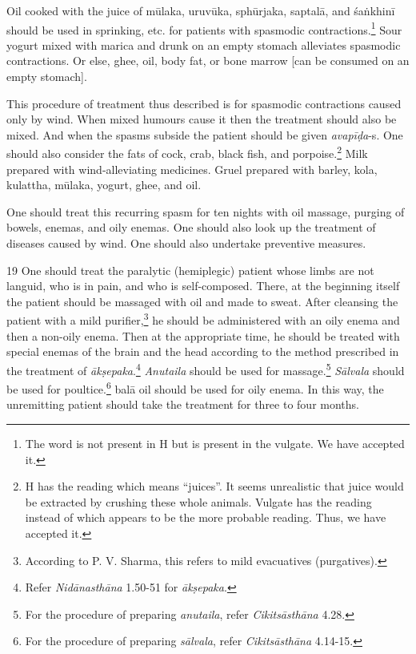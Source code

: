 \begin{translation}
    Oil cooked with the juice of \gls{mūlaka}, \gls{uruvūka}, \gls{sphūrjaka}, \gls{saptalā}, and \gls{śaṅkhinī} should be used in sprinking, etc. for patients with spasmodic contractions.\footnote{The word  is not present in H but is present in the vulgate. We have accepted it.} Sour yogurt mixed with \gls{marica} and drunk on an empty stomach alleviates spasmodic contractions. Or else, ghee, oil, body fat, or bone marrow [can be consumed on an empty stomach]. 
    
    This procedure of treatment thus described is for spasmodic contractions caused only by wind. When mixed humours cause it then the treatment should also be mixed. And when the spasms subside the patient should be given \textit{avapīḍa}-s. One should also consider the fats of cock, crab, black fish, and porpoise.\footnote{H has the reading  which means \enquote{juices}. It seems unrealistic that juice would be extracted by crushing these whole animals. Vulgate has the reading  instead of  which appears to be the more probable reading. Thus, we have accepted it.} Milk prepared with wind-alleviating medicines. Gruel prepared with barley, \gls{kola}, \gls{kulattha}, \gls{mūlaka}, yogurt, ghee, and oil. 

    One should treat this recurring spasm for ten nights with oil massage, purging of bowels, enemas, and oily enemas. One should also look up the treatment of diseases caused by wind. One should also undertake preventive measures.   

    \item[19]
    One should treat the paralytic (hemiplegic) patient whose limbs are not languid, who is in pain, and who is self-composed. There, at the beginning itself the patient should be massaged with oil and made to sweat. After cleansing the patient with a mild purifier,\footnote{According to P. V. Sharma, this refers to mild evacuatives (purgatives).} he should be administered with an oily enema and then a non-oily enema. Then at the appropriate time, he should be treated with special enemas of the brain and the head according to the method prescribed in the treatment of \textit{ākṣepaka}.\footnote{Refer \textit{Nidānasthāna} 1.50-51 for \textit{ākṣepaka}.} \textit{Anutaila} should be used for massage.\footnote{For the procedure of preparing \textit{anutaila}, refer \textit{Cikitsāsthāna} 4.28.} \textit{Sālvala} should be used for poultice.\footnote{For the procedure of preparing \textit{sālvala}, refer \textit{Cikitsāsthāna} 4.14-15.} \gls{balā} oil should be used for oily enema. In this way, the unremitting patient should take the treatment for three to four months.


\end{translation}
